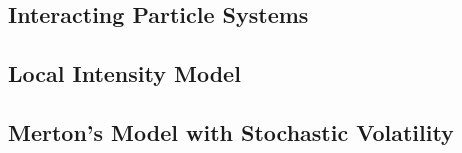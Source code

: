 \subsection{Interacting Particle Systems}

\subsection{Local Intensity Model}

\subsection{Merton's Model with Stochastic Volatility}

